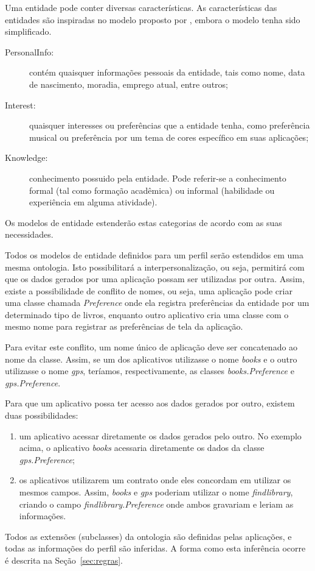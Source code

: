 Uma entidade pode conter diversas características. As características das entidades são inspiradas no modelo proposto por , embora o modelo tenha sido simplificado. 
 
\begin{description}

  \item[PersonalInfo:] contém quaisquer informações pessoais da entidade, tais como nome, data de nascimento, moradia, emprego atual, entre outros;

  \item[Interest:] quaisquer interesses ou preferências que a entidade tenha, como preferência musical ou preferência por um tema de cores específico em suas aplicações;

  \item[Knowledge:] conhecimento possuido pela entidade. Pode referir-se a conhecimento formal (tal como formação acadêmica) ou informal (habilidade ou experiência em alguma atividade).

\end{description}

Os modelos de entidade estenderão estas categorias de acordo com as suas necessidades.

Todos os modelos de entidade definidos para um perfil serão estendidos em uma mesma ontologia. Isto possibilitará a interpersonalização, ou seja, permitirá com que os dados gerados por uma aplicação possam ser utilizadas por outra. Assim, existe a possibilidade de conflito de nomes, ou seja, uma aplicação pode criar uma classe chamada {\em Preference} onde ela registra preferências da entidade por um determinado tipo de livros, enquanto outro aplicativo cria uma classe com o mesmo nome para registrar as preferências de tela da aplicação.

Para evitar este conflito, um nome único de aplicação deve ser concatenado ao nome da classe. Assim, se um dos aplicativos utilizasse o nome {\em books} e o outro utilizasse o nome {\em gps}, teríamos, respectivamente, as classes {\em books.Preference} e {\em gps.Preference}.

Para que um aplicativo possa ter acesso aos dados gerados por outro, existem duas possibilidades:

\begin{enumerate}

  \item um aplicativo acessar diretamente os dados gerados pelo outro. No exemplo acima, o aplicativo {\em books} acessaria diretamente os dados da classe {\em gps.Preference};

  \item os aplicativos utilizarem um contrato onde eles concordam em utilizar os mesmos campos. Assim, {\em books} e {\em gps} poderiam utilizar o nome {\em findlibrary}, criando o campo {\em findlibrary.Preference} onde ambos gravariam e leriam as informações.

\end{enumerate}

Todos as extensões (subclasses) da ontologia são definidas pelas aplicações, e todas as informações do perfil são inferidas. A forma como esta inferência ocorre é descrita na Seção~\ref{sec:regras}.
